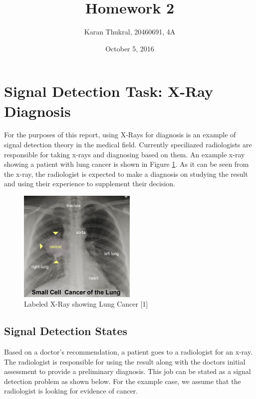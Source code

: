 \documentclass[12pt]{article}
\title{Homework 2}
\author{Karan Thukral, 20460691, 4A}
\date{October 5, 2016}
\begin{document}
	\makereporttitle


	\startarabicpagenumbers
	
	\section{Signal Detection Task: X-Ray Diagnosis}
	For the purposes of this report, using X-Rays for diagnosis is an example of signal detection theory in the medical field. Currently speciliazed radiologists are responsible for taking x-rays and diagnosing based on them. An example x-ray showing a patient with lung cancer is shown in Figure \ref{lungcancer}. As it can be seen from the x-ray, the radiologist is expected to make a diagnosis on studying the result and using their experience to supplement their decision.
	
	\begin{figure}[!ht]
		\centering
		\includegraphics[width=0.5\textwidth]{lungcancer}
		\caption{Labeled X-Ray showing Lung Cancer [1]}
		\label{lungcancer}
	\end{figure}
	
	\subsection{Signal Detection States}
	Based on a doctor's recommendation, a patient goes to a radiologist for an x-ray. The radiologist is responsible for using the result along with the doctors initial assessment to provide a preliminary diagnosis. This job can be stated as a signal detection problem as shown below. For the example case, we assume that the radiologist is looking for evidence of cancer.
	
\end{document}
